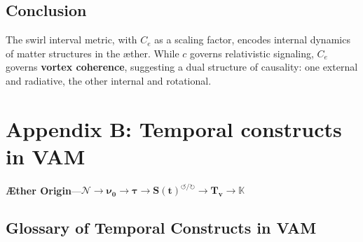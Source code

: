 \documentclass[12pt]{article}
\begin{document}
    \subsection*{Conclusion}

    The swirl interval metric, with \( C_e \) as a scaling factor, encodes internal dynamics of matter structures in the æther. While \( c \) governs relativistic signaling, \( C_e \) governs \textbf{vortex coherence}, suggesting a dual structure of causality: one external and radiative, the other internal and rotational.

\section*{Appendix B: Temporal constructs in VAM}\label{sec:temporal-constructs}
    \textbf{Æther Origin}—\( \boldsymbol{\mathcal{N}} \longrightarrow \boldsymbol{\nu_0} \longrightarrow \boldsymbol{\tau} \longrightarrow \boldsymbol{S(t)^{\bm{\circlearrowleft} / \bm{\circlearrowright}}} \longrightarrow \boldsymbol{T_v} \longrightarrow \boldsymbol{\mathbb{K}} \)
    \subsection*{Glossary of Temporal Constructs in VAM}
\end{document}
